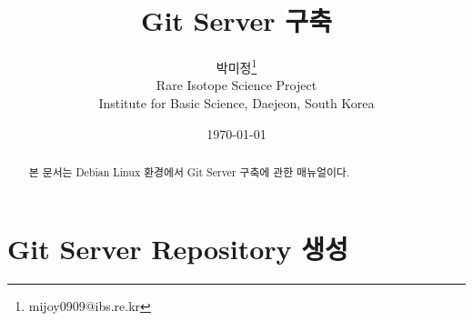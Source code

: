 \documentclass[11pt
  , a4paper
  , article
  , oneside
]{memoir}
\begin{document}
 
\newcommand{\technumber}{
  RAON Control-Document Series\\
  Revision : v0.1,   Release : December. 01. 2015}
\title{\textbf{Git Server 구축}}

\author{박미정\thanks{mijoy0909@ibs.re.kr} \\
  Rare Isotope Science Project\\
  Institute for Basic Science, Daejeon, South Korea
}
\date{\today}


\renewcommand{\maketitlehooka}{\begin{flushright}\textsf{\technumber}\end{flushright}}

\maketitle

\begin{abstract}
본 문서는 Debian Linux 환경에서 Git Server 구축에 관한 매뉴얼이다. 
\end{abstract}


\chapter{Git Server Repository 생성}
\end{document}
